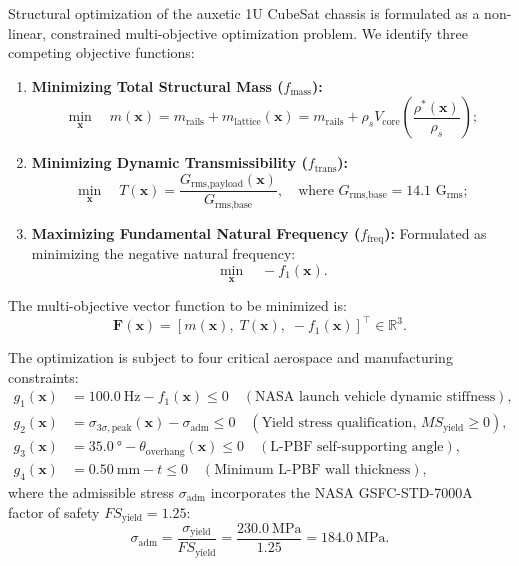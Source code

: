 Structural optimization of the auxetic 1U CubeSat chassis is formulated as a non-linear, constrained multi-objective optimization problem. We identify three competing objective functions:
\begin{enumerate}
\item \textbf{Minimizing Total Structural Mass ($f_{\text{mass}}$):}
\begin{equation}
\min_{\mathbf{x}} \quad m(\mathbf{x}) = m_{\text{rails}} + m_{\text{lattice}}(\mathbf{x}) = m_{\text{rails}} + \rho_s V_{\text{core}} \left(\frac{\rho^*(\mathbf{x})}{\rho_s}\right);
\label{eq:obj_mass}
\end{equation}
\item \textbf{Minimizing Dynamic Transmissibility ($f_{\text{trans}}$):}
\begin{equation}
\min_{\mathbf{x}} \quad T(\mathbf{x}) = \frac{G_{\text{rms,payload}}(\mathbf{x})}{G_{\text{rms,base}}}, \quad \text{where } G_{\text{rms,base}} = 14.1\text{ G}_{\text{rms}};
\label{eq:obj_trans}
\end{equation}
\item \textbf{Maximizing Fundamental Natural Frequency ($f_{\text{freq}}$):} Formulated as minimizing the negative natural frequency:
\begin{equation}
\min_{\mathbf{x}} \quad -f_1(\mathbf{x}).
\label{eq:obj_freq}
\end{equation}
\end{enumerate}

The multi-objective vector function to be minimized is:
\begin{equation}
\mathbf{F}(\mathbf{x}) = \left[ m(\mathbf{x}), \; T(\mathbf{x}), \; -f_1(\mathbf{x}) \right]^\top \in \mathbb{R}^3.
\label{eq:objective_vector}
\end{equation}

The optimization is subject to four critical aerospace and manufacturing constraints:
\begin{align}
g_1(\mathbf{x}) &= \SI{100.0}{\hertz} - f_1(\mathbf{x}) \le 0 \quad (\text{NASA launch vehicle dynamic stiffness}), \label{eq:con_f1} \\
g_2(\mathbf{x}) &= \sigma_{3\sigma,\text{peak}}(\mathbf{x}) - \sigma_{\text{adm}} \le 0 \quad (\text{Yield stress qualification, } MS_{\text{yield}} \ge 0), \label{eq:con_yield} \\
g_3(\mathbf{x}) &= \SI{35.0}{\degree} - \theta_{\text{overhang}}(\mathbf{x}) \le 0 \quad (\text{L-PBF self-supporting angle}), \label{eq:con_overhang} \\
g_4(\mathbf{x}) &= \SI{0.50}{\milli\meter} - t \le 0 \quad (\text{Minimum L-PBF wall thickness}), \label{eq:con_thick}
\end{align}
where the admissible stress $\sigma_{\text{adm}}$ incorporates the NASA GSFC-STD-7000A factor of safety $FS_{\text{yield}} = 1.25$:
\begin{equation}
\sigma_{\text{adm}} = \frac{\sigma_{\text{yield}}}{FS_{\text{yield}}} = \frac{\SI{230.0}{\mega\pascal}}{1.25} = \SI{184.0}{\mega\pascal}.
\label{eq:sigma_adm_gevs}
\end{equation}

